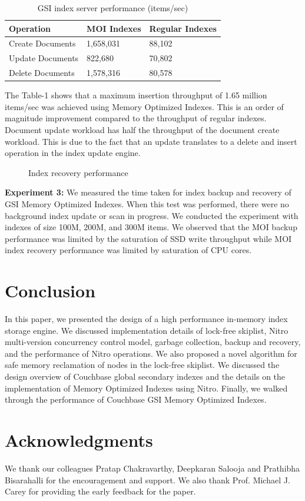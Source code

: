 \documentclass{vldb}
\begin{document}
\begin{table}[h]
\caption{GSI index server performance (items/sec)}
\begin{tabularx}{\linewidth}{|X|l|l|} \hline
Operation&MOI Indexes&Regular Indexes\\ \hline
Create Documents&1,658,031&88,102 \\ \hline
Update Documents&822,680&70,802 \\ \hline
Delete Documents&1,578,316&80,578 \\ \hline
\hline\end{tabularx}
\end{table}

The Table-1 shows that a maximum insertion throughput of 1.65 million items/sec was achieved using Memory Optimized Indexes. This is an order of magnitude improvement compared to the throughput of regular indexes. Document update workload has half the throughput of the document create workload. This is due to the fact that an update translates to a delete and insert operation in the index update engine.

\begin{figure}[h]

\caption{Index recovery performance}
\end{figure}

\textbf{Experiment 3:} We measured the time taken for index backup and recovery of GSI Memory Optimized Indexes. When this test was performed, there were no background index update or scan in progress. We conducted the experiment with indexes of size 100M, 200M, and 300M items. We observed that the MOI backup performance was limited by the saturation of SSD write throughput while MOI index recovery performance was limited by saturation of CPU cores.

\section{Conclusion}
In this paper, we presented the design of a high performance in-memory index storage engine. We discussed implementation details of lock-free skiplist, Nitro multi-version concurrency control model, garbage collection, backup and recovery, and the performance of Nitro operations. We also proposed a novel algorithm for safe memory reclamation of nodes in the lock-free skiplist. We discussed the design overview of Couchbase global secondary indexes and the details on the implementation of Memory Optimized Indexes using Nitro. Finally, we walked through the performance of Couchbase GSI Memory Optimized Indexes.

 \section{Acknowledgments}
We thank our colleagues Pratap Chakravarthy, Deepkaran Salooja and Prathibha Bisarahalli for the encouragement and support. We also thank Prof. Michael J. Carey for providing the early feedback for the paper. 




\end{document}
